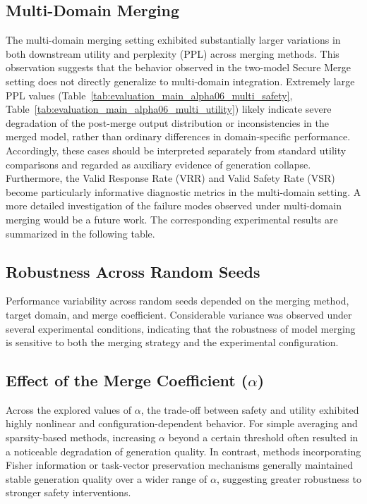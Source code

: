 \subsection{Multi-Domain Merging}

The multi-domain merging setting exhibited substantially larger variations in both downstream utility and perplexity (PPL) across merging methods. This observation suggests that the behavior observed in the two-model Secure Merge setting does not directly generalize to multi-domain integration. Extremely large PPL values (Table~\ref{tab:evaluation_main_alpha06_multi_safety}, Table~\ref{tab:evaluation_main_alpha06_multi_utility}) likely indicate severe degradation of the post-merge output distribution or inconsistencies in the merged model, rather than ordinary differences in domain-specific performance. Accordingly, these cases should be interpreted separately from standard utility comparisons and regarded as auxiliary evidence of generation collapse. Furthermore, the Valid Response Rate (VRR) and Valid Safety Rate (VSR) become particularly informative diagnostic metrics in the multi-domain setting. A more detailed investigation of the failure modes observed under multi-domain merging would be a future work. The corresponding experimental results are summarized in the following table.

\FloatBarrier
\subsection{Robustness Across Random Seeds}

Performance variability across random seeds depended on the merging method, target domain, and merge coefficient. Considerable variance was observed under several experimental conditions, indicating that the robustness of model merging is sensitive to both the merging strategy and the experimental configuration.

\subsection{Effect of the Merge Coefficient ($\alpha$)}

Across the explored values of $\alpha$, the trade-off between safety and utility exhibited highly nonlinear and configuration-dependent behavior. For simple averaging and sparsity-based methods, increasing $\alpha$ beyond a certain threshold often resulted in a noticeable degradation of generation quality. In contrast, methods incorporating Fisher information or task-vector preservation mechanisms generally maintained stable generation quality over a wider range of $\alpha$, suggesting greater robustness to stronger safety interventions.

